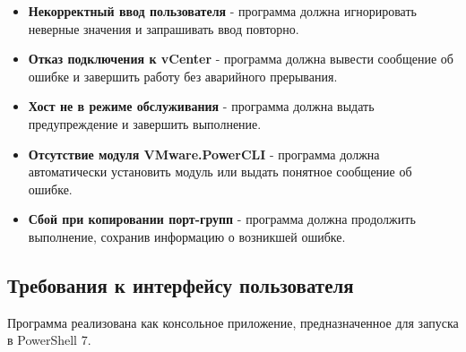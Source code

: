 \begin{itemize}
    \item \textbf{Некорректный ввод пользователя} - программа должна игнорировать неверные значения и запрашивать ввод повторно.
    \item \textbf{Отказ подключения к vCenter} - программа должна вывести сообщение об ошибке и завершить работу без аварийного прерывания.
    \item \textbf{Хост не в режиме обслуживания} - программа должна выдать предупреждение и завершить выполнение.
    \item \textbf{Отсутствие модуля VMware.PowerCLI} - программа должна автоматически установить модуль или выдать понятное сообщение об ошибке.
    \item \textbf{Сбой при копировании порт-групп} - программа должна продолжить выполнение, сохранив информацию о возникшей ошибке.
\end{itemize}

\subsection{Требования к интерфейсу пользователя}
Программа реализована как консольное приложение, предназначенное для запуска в PowerShell 7.

